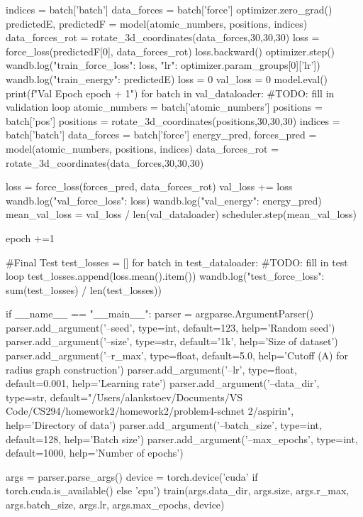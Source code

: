             indices = batch['batch']
            data_forces = batch['force']
            optimizer.zero_grad()
            predictedE, predictedF = model(atomic_numbers, positions, indices)
            data_forces_rot = rotate_3d_coordinates(data_forces,30,30,30)
            loss = force_loss(predictedF[0], data_forces_rot)
            loss.backward()
            optimizer.step()
            wandb.log({"train_force_loss": loss, "lr": optimizer.param_groups[0]['lr']})
            wandb.log({"train_energy": predictedE})
        loss = 0
        val_loss = 0
        model.eval()
        print(f"Val Epoch {epoch + 1}")
        for batch in val_dataloader:
            #TODO: fill in validation loop
            atomic_numbers = batch['atomic_numbers']
            positions = batch['pos']
            positions = rotate_3d_coordinates(positions,30,30,30)
            indices = batch['batch']
            data_forces = batch['force']
            energy_pred, forces_pred = model(atomic_numbers, positions, indices)
            data_forces_rot = rotate_3d_coordinates(data_forces,30,30,30)

            loss = force_loss(forces_pred, data_forces_rot)
            val_loss += loss
            wandb.log({"val_force_loss": loss})
            wandb.log({"val_energy": energy_pred})
        mean_val_loss = val_loss / len(val_dataloader)
        scheduler.step(mean_val_loss)
        
        epoch +=1
    
    #Final Test
    test_losses = []
    for batch in test_dataloader:
        #TODO: fill in test loop
        test_losses.append(loss.mean().item())
    wandb.log({"test_force_loss": sum(test_losses) / len(test_losses)})

if __name__ == "__main__":
    parser = argparse.ArgumentParser()
    parser.add_argument('--seed', type=int, default=123, help='Random seed')
    parser.add_argument('--size', type=str, default='1k', help='Size of dataset')
    parser.add_argument('--r_max', type=float, default=5.0, help='Cutoff (A) for radius graph construction')
    parser.add_argument('--lr', type=float, default=0.001, help='Learning rate')
    parser.add_argument('--data_dir', type=str, default="/Users/alankstoev/Documents/VS Code/CS294/homework2/homework2/problem4-schnet 2/aspirin", help='Directory of data')
    parser.add_argument('--batch_size', type=int, default=128, help='Batch size')
    parser.add_argument('--max_epochs', type=int, default=1000, help='Number of epochs')


    args = parser.parse_args()
    device = torch.device('cuda' if torch.cuda.is_available() else 'cpu')
    train(args.data_dir, args.size, args.r_max, args.batch_size, args.lr, args.max_epochs, device)
